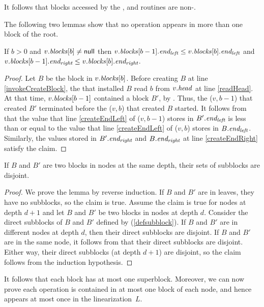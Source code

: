 It follows that blocks accessed by the ,  and  routines are non-\nl.

The following two lemmas show that no operation appears in more than one block of the root.
\begin{lemma} \label{lem::headProgress}
 If $b>0$ and $v.\mbox{\textit{blocks}}[b] \neq \mbox{\sf null}$ then 
 $v.\mbox{\textit{blocks}}[b-1].\mbox{\textit{end\textsubscript{left}}} \leq v.\mbox{\textit{blocks}}[b].\mbox{\textit{end\textsubscript{left}}}$ and 
 $v.\mbox{\textit{blocks}}[b-1].\mbox{\textit{end\textsubscript{right}}} \leq v.\mbox{\textit{blocks}}[b].\mbox{\textit{end\textsubscript{right}}}$.
\end{lemma}
\begin{proof}
Let $B$ be the block in $v.\mbox{\textit{blocks}}[b]$.
Before creating $B$ at line \ref{invokeCreateBlock}, the  that installed $B$
read $b$ from $v.\mbox{\textit{head}}$ at line \ref{readHead}.
At that time, $v.\mbox{\textit{blocks}}[b-1]$ contained a block $B'$, by .
Thus, the ($v,b-1$) that created $B'$ terminated before the ($v,b$) that
created $B$ started.
It follows from  that the value that 
line \ref{createEndLeft} of ($v,b-1$) stores in $B'.\mbox{\textit{end\textsubscript{left}}}$   
is less than or equal to the value that line \ref{createEndLeft} of ($v,b$) 
stores in $B.\mbox{\textit{end\textsubscript{left}}}$.
Similarly, the values stored in $B'.\mbox{\textit{end\textsubscript{right}}}$ and $B.\mbox{\textit{end\textsubscript{right}}}$ at line \ref{createEndRight} 
satisfy the claim.
\end{proof}

\begin{lemma} \label{lem::subblocksDistinct}
If $B$ and $B'$ are two blocks in nodes at the same depth, their sets of subblocks are disjoint.
\end{lemma}
\begin{proof}
We prove the lemma by reverse induction.
If $B$ and $B'$ are in leaves, they have no subblocks, so the claim is true.
Assume the claim is true for nodes at depth $d+1$ and let $B$ and $B'$ be two blocks in nodes at depth $d$.
Consider the direct subblocks of $B$ and $B'$ defined by (\ref{defsubblock}).
If $B$ and $B'$ are in different nodes at depth $d$, then their direct subblocks are disjoint.
If $B$ and $B'$ are in the same node, it follows from  that their direct subblocks are disjoint.
Either way, their direct subblocks (at depth $d+1$) are disjoint, so the claim follows from the induction hypothesis.
\end{proof}

It follows that each block has at most one superblock.
Moreover, we can now prove each operation is contained in at most one block of each node,
and hence appears at most once in the linearization~$L$.

